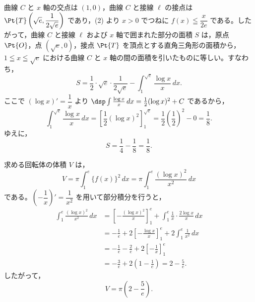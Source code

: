 
曲線 $C$ と $x$ 軸の交点は $(1, 0)$，曲線 $C$ と接線 $\ell$ の接点は $\Pt{T}\left(\sqrt{e}, \dfrac{1}{2\sqrt{e}}\right)$ であり，(2) より $x>0$ でつねに $f(x)\leqq\dfrac{x}{2e}$ である。したがって，曲線 $C$ と接線 $\ell$ および $x$ 軸で囲まれた部分の面積 $S$ は，原点 $\Pt{O}$，点 $\left(\sqrt{e}, 0\right)$，接点 $\Pt{T}$ を頂点とする直角三角形の面積から，$1\leqq x\leqq\sqrt{e}$ における曲線 $C$ と $x$ 軸の間の面積を引いたものに等しい。すなわち，
\[
  S = \frac{1}{2}\cdot\sqrt{e}\cdot\frac{1}{2\sqrt{e}} - \int_{1}^{\sqrt{e}}\frac{\log x}{x}\,dx.
\]
ここで $(\log x)'=\dfrac{1}{x}$ より $\dsp\int\frac{\log x}{x}\,dx=\frac{1}{2}(\log x)^{2}+C$ であるから，
\[
  \int_{1}^{\sqrt{e}}\frac{\log x}{x}\,dx
  = \left[\frac{1}{2}(\log x)^{2}\right]_{1}^{\sqrt{e}}
  = \frac{1}{2}\left(\frac{1}{2}\right)^{2} - 0 = \frac{1}{8}.
\]
ゆえに，
\[
  S = \frac{1}{4} - \frac{1}{8} = \frac{1}{8}.
\]


求める回転体の体積 $V$ は，
\[
  V = \pi\int_{1}^{e}\{f(x)\}^{2}\,dx = \pi\int_{1}^{e}\frac{(\log x)^{2}}{x^{2}}\,dx
\]
である。$\left(-\dfrac{1}{x}\right)'=\dfrac{1}{x^{2}}$ を用いて部分積分を行うと，
\begin{align*}
  \int_{1}^{e}\frac{(\log x)^{2}}{x^{2}}\,dx
  &= \left[-\frac{(\log x)^{2}}{x}\right]_{1}^{e} + \int_{1}^{e}\frac{1}{x}\cdot\frac{2\log x}{x}\,dx \\
  &= -\frac{1}{e} + 2\left[-\frac{\log x}{x}\right]_{1}^{e} + 2\int_{1}^{e}\frac{1}{x^{2}}\,dx \\
  &= -\frac{1}{e} - \frac{2}{e} + 2\left[-\frac{1}{x}\right]_{1}^{e} \\
  &= -\frac{3}{e} + 2\left(1-\frac{1}{e}\right) = 2 - \frac{5}{e}.
\end{align*}
したがって，
\[
  V = \pi\left(2-\frac{5}{e}\right).
\]


